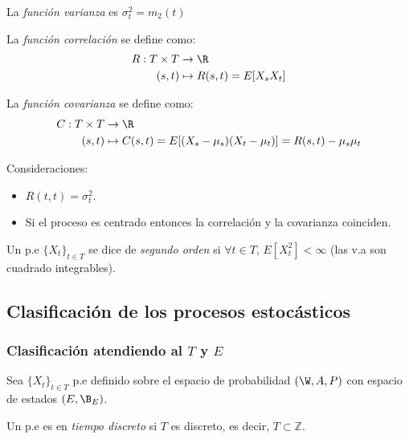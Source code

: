 \begin{ndef}
  La \emph{función varianza} es $\sigma^2_t = m_2(t)$
\end{ndef}

\begin{ndef}
  La \emph{función correlación} se define como:
  \begin{align*}
    R : T \times T & \to \R \\
    (s,t) & \mapsto R(s,t) = E[X_s X_t]
  \end{align*}
\end{ndef}

\begin{ndef}
  La \emph{función covarianza} se define como:
  \begin{align*}
    C: T \times T & \to \R \\
    (s,t) & \mapsto C(s,t) = E[(X_s - \mu_s)(X_t - \mu_t)] = R(s,t) - \mu_s \mu_t
  \end{align*}
\end{ndef}

\begin{nota}
  Consideraciones:
  \begin{itemize}
    \item $R(t,t) = \sigma^2_t$.
    \item Si el proceso es centrado entonces la correlación y la covarianza coinciden.
  \end{itemize}
\end{nota}

\begin{ndef}
  Un p.e $\{X_t\}_{t \in T}$ se dice de \emph{segundo orden} si $\forall t \in T, \, E[X^2_t] < \infty$ (las v.a son cuadrado integrables).
\end{ndef}

\subsection{Clasificación de los procesos estocásticos}

\subsubsection{Clasificación atendiendo al $T$ y $E$}
Sea $\{X_t\}_{t \in T}$ p.e definido sobre el espacio de probabilidad $(\W, A, P)$ con espacio de estados $(E, \B_E)$.

\begin{ndef}
  Un p.e es en \emph{tiempo discreto} si $T$ es discreto, es decir, $T \subset \mathbb{Z}$.
\end{ndef}

